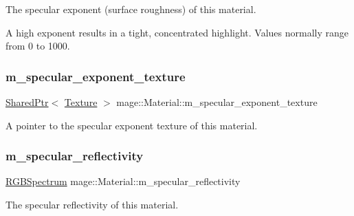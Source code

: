 The specular exponent (surface roughness) of this material.

A high exponent results in a tight, concentrated highlight. Values normally range from 0 to 1000. \hypertarget{structmage_1_1_material_a452a92691f612bd21857525c00c5e8e5}{}\label{structmage_1_1_material_a452a92691f612bd21857525c00c5e8e5} 
\subsubsection{\texorpdfstring{m\+\_\+specular\+\_\+exponent\+\_\+texture}{m\_specular\_exponent\_texture}}
{\footnotesize\ttfamily \hyperlink{namespacemage_a1e01ae66713838a7a67d30e44c67703e}{Shared\+Ptr}$<$ \hyperlink{classmage_1_1_texture}{Texture} $>$ mage\+::\+Material\+::m\+\_\+specular\+\_\+exponent\+\_\+texture\hspace{0.3cm}{\ttfamily [private]}}

A pointer to the specular exponent texture of this material. \hypertarget{structmage_1_1_material_a45587388f4ff57c209de2280b71af9d3}{}\label{structmage_1_1_material_a45587388f4ff57c209de2280b71af9d3} 
\subsubsection{\texorpdfstring{m\+\_\+specular\+\_\+reflectivity}{m\_specular\_reflectivity}}
{\footnotesize\ttfamily \hyperlink{structmage_1_1_r_g_b_spectrum}{R\+G\+B\+Spectrum} mage\+::\+Material\+::m\+\_\+specular\+\_\+reflectivity\hspace{0.3cm}{\ttfamily [private]}}

The specular reflectivity of this material. \hypertarget{structmage_1_1_material_ac925df9d71f8668c03e8efada632b300}{}\label{structmage_1_1_material_ac925df9d71f8668c03e8efada632b300} 
